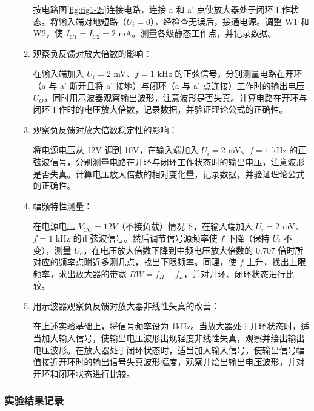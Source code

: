 \documentclass[dvipsnames, svgnames,a4paper,11pt]{article}
\begin{document}
\begin{itemize}
\begin{enumerate}
						按电路图\cref{fig:fig1-2t}连接电路，连接 a 和 a' 点使放大器处于闭环工作状态。将输入端对地短路（$U_i = 0$），经检查无误后，接通电源。调整 W1 和 W2，使 $I_{C1} = I_{C2} = 2$ mA。测量各级静态工作点，并记录数据。


					\item 观察负反馈对放大倍数的影响：
					
						在输入端加入 $U_i = 2$ mV、$f = 1$ kHz 的正弦信号，分别测量电路在开环（a 与 a' 断开且将 a' 接地）与闭环（a 与 a' 点连接）工作时的输出电压 $U_O$，同时用示波器观察输出波形，注意波形是否失真。计算电路在开环与闭环工作时的电压放大倍数，记录数据，并验证理论公式的正确性。


					\item 观察负反馈对放大倍数稳定性的影响：
					
						将电源电压从 12V 调到 10V，在输入端加入 $U_i = 2$ mV、$f = 1$ kHz 的正弦波信号，分别测量电路在开环与闭环工作状态时的输出电压，注意波形是否失真。计算电压放大倍数的相对变化量，记录数据，并验证理论公式的正确性。


					\item 幅频特性测量：
					
						在电源电压 $V_{CC} = 12V$（不接负载）情况下，在输入端加入 $U_i = 2$ mV、$f = 1$ kHz 的正弦波信号。然后调节信号源频率使 $f$ 下降（保持 $U_i$ 不变），测量 $U_o$，在电压放大倍数下降到中频电压放大倍数的 0.707 倍时所对应的频率点附近多测几点，找出下限频率。同理，使 $f$ 上升，找出上限频率，求出放大器的带宽 $BW = f_H - f_L$，并对开环、闭环状态进行比较。


					\item 用示波器观察负反馈对放大器非线性失真的改善：
					
						在上述实验基础上，将信号频率设为 1kHz。当放大器处于开环状态时，适当加大输入信号，使输出电压波形出现轻度非线性失真，观察并绘出输出电压波形。在放大器处于闭环状态时，适当加大输入信号，使输出信号幅值接近开环时的输出信号失真波形幅度，观察并绘出输出电压波形，并对开环和闭环状态进行比较。

				\end{enumerate}
			

		\end{itemize}	
	
	\subsubsection{实验结果记录}
\end{document}
